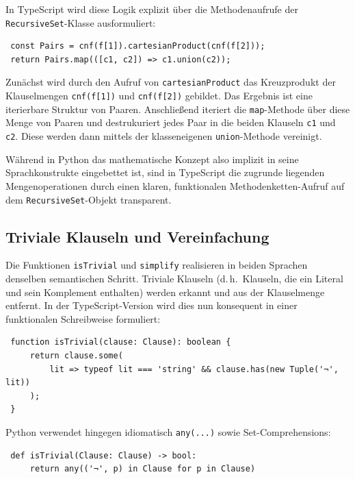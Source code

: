 In TypeScript wird diese Logik explizit über die Methodenaufrufe der \texttt{RecursiveSet}-Klasse ausformuliert:

\begin{verbatim}
 const Pairs = cnf(f[1]).cartesianProduct(cnf(f[2]));
 return Pairs.map(([c1, c2]) => c1.union(c2));
\end{verbatim}

Zunächst wird durch den Aufruf von \texttt{cartesianProduct} das Kreuzprodukt der Klauselmengen \texttt{cnf(f[1])} und \texttt{cnf(f[2])} gebildet. Das Ergebnis ist eine iterierbare Struktur von Paaren. Anschließend iteriert die \texttt{map}-Methode über diese Menge von Paaren und destrukuriert jedes Paar in die beiden Klauseln \texttt{c1} und \texttt{c2}. Diese werden dann mittels der klasseneigenen \texttt{union}-Methode vereinigt. 

Während in Python das mathematische Konzept also implizit in seine Sprachkonstrukte eingebettet ist, sind in TypeScript die zugrunde liegenden Mengenoperationen durch einen klaren, funktionalen Methodenketten-Aufruf auf dem \texttt{RecursiveSet}-Objekt transparent.


\subsection{Triviale Klauseln und Vereinfachung}
Die Funktionen \texttt{isTrivial} und \texttt{simplify} realisieren in beiden Sprachen denselben semantischen Schritt. Triviale Klauseln (d.\,h.\ Klauseln, die ein Literal und sein Komplement enthalten) werden erkannt und aus der Klauselmenge entfernt. 
In der TypeScript-Version wird dies nun konsequent in einer funktionalen Schreibweise formuliert:

\begin{verbatim}
 function isTrivial(clause: Clause): boolean {
     return clause.some(
         lit => typeof lit === 'string' && clause.has(new Tuple('¬', lit))
     );
 }
\end{verbatim}


Python verwendet hingegen idiomatisch \texttt{any(...)} sowie Set-Comprehensions:
\begin{verbatim}
 def isTrivial(Clause: Clause) -> bool:
     return any(('¬', p) in Clause for p in Clause)
\end{verbatim}

